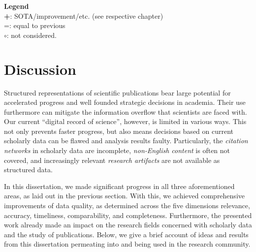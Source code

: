\begin{infobox-progress}
      \vspace{0.5em}
      \begin{footnotesize}
      \textbf{Legend}\\
      \textbf{+}: SOTA/improvement/etc. (see respective chapter)\\
      =: equal to previous\\
      $\circ$: not considered.
      \end{footnotesize}
\end{infobox-progress}

\section{Discussion}

Structured representations of scientific publications bear large potential for accelerated progress and well founded strategic decisions in academia. Their use furthermore can mitigate the information overflow that scientists are faced with.
Our current ``digital record of science'', however, is limited in various ways. This not only prevents faster progress, but also means decisions based on current scholarly data can be flawed and analysis results faulty.
Particularly, the \emph{citation networks} in scholarly data are incomplete, \emph{non-English content} is often not covered, and increasingly relevant \emph{research artifacts} are not available as structured data.

In this dissertation, we made significant progress in all three aforementioned areas, as laid out in the previous section. With this, we achieved comprehensive improvements of data quality, as determined across the five dimensions relevance, accuracy, timeliness, comparability, and completeness. Furthermore, the presented work already made an impact on the research fields concerned with scholarly data and the study of publications. Below, we give a brief account of ideas and results from this dissertation permeating into and being used in the research community.

